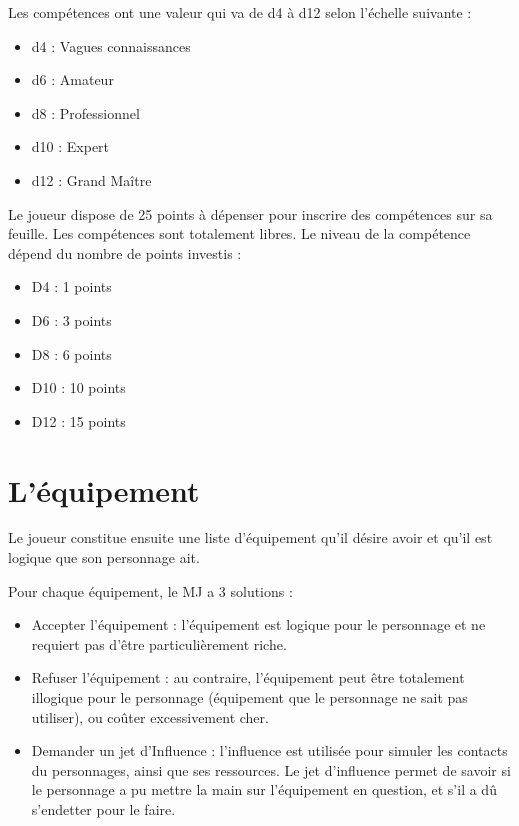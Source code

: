 \documentclass{conf/FusinaClass}
\begin{document}
Les compétences ont une valeur qui va de d4 à d12 selon l'échelle suivante : 

\begin{itemize}
\item d4 : Vagues connaissances
\item d6 : Amateur
\item d8 : Professionnel
\item d10 : Expert
\item d12 : Grand Maître
\end{itemize}

Le joueur dispose de 25 points à dépenser pour inscrire des compétences sur sa feuille. Les compétences sont totalement libres. Le niveau de la compétence dépend du nombre de points investis :

\begin{itemize}
\item D4 : 1 points
\item D6 : 3 points
\item D8 : 6 points
\item D10 : 10 points
\item D12 : 15 points
\end{itemize}


\chapter{L'équipement}
Le joueur constitue ensuite une liste d'équipement qu'il désire avoir et qu'il est logique que son personnage ait.

Pour chaque équipement, le MJ a 3 solutions : 

\begin{itemize}
\item Accepter l'équipement : l'équipement est logique pour le personnage et ne requiert pas d'être particulièrement riche. 
\item Refuser l'équipement : au contraire, l'équipement peut être totalement illogique pour le personnage (équipement que le personnage ne sait pas utiliser), ou coûter excessivement cher.
\item Demander un jet d'Influence : l'influence est utilisée pour simuler les contacts du personnages, ainsi que ses ressources. Le jet d'influence permet de savoir si le personnage a pu mettre la main sur l'équipement en question, et s'il a dû s'endetter pour le faire.
\end{itemize}
\end{document}
